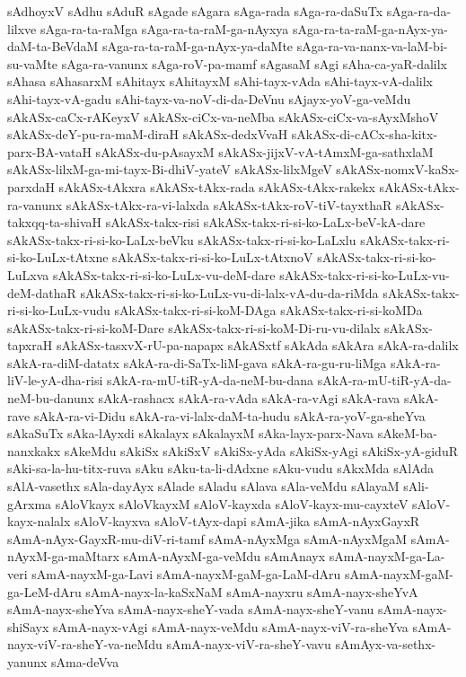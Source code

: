 {sAdhoyxV
sAdhu
sAduR
sAgade
sAgara
sAga-rada
sAga-ra-daSuTx
sAga-ra-da-lilxve
sAga-ra-ta-raMga
sAga-ra-ta-raM-ga-nAyxya
sAga-ra-ta-raM-ga-nAyx-ya-daM-ta-BeVdaM
sAga-ra-ta-raM-ga-nAyx-ya-daMte
sAga-ra-va-nanx-va-laM-bi-su-vaMte
sAga-ra-vanunx
sAga-roV-pa-mamf
sAgasaM
sAgi
sAha-ca-yaR-dalilx
sAhasa
sAhasarxM
sAhitayx
sAhitayxM
sAhi-tayx-vAda
sAhi-tayx-vA-dalilx
sAhi-tayx-vA-gadu
sAhi-tayx-va-noV-di-da-DeVnu
sAjayx-yoV-ga-veMdu
sAkASx-caCx-rAKeyxV
sAkASx-ciCx-va-neMba
sAkASx-ciCx-va-sAyxMshoV
sAkASx-deY-pu-ra-maM-diraH
sAkASx-dedxVvaH
sAkASx-di-cACx-sha-kitx-parx-BA-vataH
sAkASx-du-pAsayxM
sAkASx-jijxV-vA-tAmxM-ga-sathxlaM
sAkASx-lilxM-ga-mi-tayx-Bi-dhiV-yateV
sAkASx-lilxMgeV
sAkASx-nomxV-kaSx-parxdaH
sAkASx-tAkxra
sAkASx-tAkx-rada
sAkASx-tAkx-rakekx
sAkASx-tAkx-ra-vanunx
sAkASx-tAkx-ra-vi-lalxda
sAkASx-tAkx-roV-tiV-tayxthaR
sAkASx-takxqq-ta-shivaH
sAkASx-takx-risi
sAkASx-takx-ri-si-ko-LaLx-beV-kA-dare
sAkASx-takx-ri-si-ko-LaLx-beVku
sAkASx-takx-ri-si-ko-LaLxlu
sAkASx-takx-ri-si-ko-LuLx-tAtxne
sAkASx-takx-ri-si-ko-LuLx-tAtxnoV
sAkASx-takx-ri-si-ko-LuLxva
sAkASx-takx-ri-si-ko-LuLx-vu-deM-dare
sAkASx-takx-ri-si-ko-LuLx-vu-deM-dathaR
sAkASx-takx-ri-si-ko-LuLx-vu-di-lalx-vA-du-da-riMda
sAkASx-takx-ri-si-ko-LuLx-vudu
sAkASx-takx-ri-si-koM-DAga
sAkASx-takx-ri-si-koMDa
sAkASx-takx-ri-si-koM-Dare
sAkASx-takx-ri-si-koM-Di-ru-vu-dilalx
sAkASx-tapxraH
sAkASx-tasxvX-rU-pa-napapx
sAkASxtf
sAkAda
sAkAra
sAkA-ra-dalilx
sAkA-ra-diM-datatx
sAkA-ra-di-SaTx-liM-gava
sAkA-ra-gu-ru-liMga
sAkA-ra-liV-le-yA-dha-risi
sAkA-ra-mU-tiR-yA-da-neM-bu-dana
sAkA-ra-mU-tiR-yA-da-neM-bu-danunx
sAkA-rashacx
sAkA-ra-vAda
sAkA-ra-vAgi
sAkA-rava
sAkA-rave
sAkA-ra-vi-Didu
sAkA-ra-vi-lalx-daM-ta-hudu
sAkA-ra-yoV-ga-sheYva
sAkaSuTx
sAka-lAyxdi
sAkalayx
sAkalayxM
sAka-layx-parx-Nava
sAkeM-ba-nanxkakx
sAkeMdu
sAkiSx
sAkiSxV
sAkiSx-yAda
sAkiSx-yAgi
sAkiSx-yA-giduR
sAki-sa-la-hu-titx-ruva
sAku
sAku-ta-li-dAdxne
sAku-vudu
sAkxMda
sAlAda
sAlA-vasethx
sAla-dayAyx
sAlade
sAladu
sAlava
sAla-veMdu
sAlayaM
sAli-gArxma
sAloVkayx
sAloVkayxM
sAloV-kayxda
sAloV-kayx-mu-cayxteV
sAloV-kayx-nalalx
sAloV-kayxva
sAloV-tAyx-dapi
sAmA-jika
sAmA-nAyxGayxR
sAmA-nAyx-GayxR-mu-diV-ri-tamf
sAmA-nAyxMga
sAmA-nAyxMgaM
sAmA-nAyxM-ga-maMtarx
sAmA-nAyxM-ga-veMdu
sAmAnayx
sAmA-nayxM-ga-La-veri
sAmA-nayxM-ga-Lavi
sAmA-nayxM-gaM-ga-LaM-dAru
sAmA-nayxM-gaM-ga-LeM-dAru
sAmA-nayx-la-kaSxNaM
sAmA-nayxru
sAmA-nayx-sheYvA
sAmA-nayx-sheYva
sAmA-nayx-sheY-vada
sAmA-nayx-sheY-vanu
sAmA-nayx-shiSayx
sAmA-nayx-vAgi
sAmA-nayx-veMdu
sAmA-nayx-viV-ra-sheYva
sAmA-nayx-viV-ra-sheY-va-neMdu
sAmA-nayx-viV-ra-sheY-vavu
sAmAyx-va-sethx-yanunx
sAma-deVva
}
